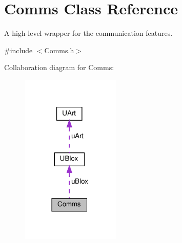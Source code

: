 \hypertarget{class_comms}{}\section{Comms Class Reference}
\label{class_comms}


A high-\/level wrapper for the communication features.  




{\ttfamily \#include $<$Comms.\+h$>$}



Collaboration diagram for Comms\+:\nopagebreak
\begin{figure}[H]
\begin{center}
\leavevmode
\includegraphics[width=134pt]{d4/d7a/class_comms__coll__graph}
\end{center}
\end{figure}
